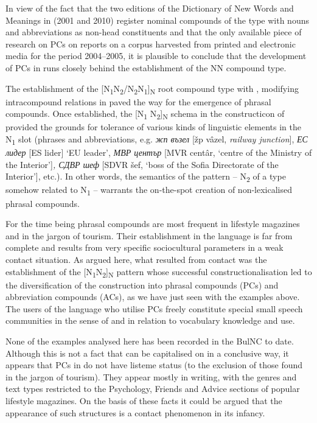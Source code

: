 \documentclass[output=paper]{LSP/langsci}
\begin{document}
In view of the fact that the two editions of the Dictionary of New Words and Meanings in  (2001 and 2010) register nominal compounds of the  type with nouns and abbreviations as non-head constituents and that the only available piece of research on PCs on  reports on a corpus harvested from printed and electronic media for the period 2004–2005, it is plausible to conclude that the development of PCs in  runs closely behind the establishment of the NN  compound type.



The establishment of the [N\textsubscript{1}N\textsubscript{2}/N\textsubscript{2}N\textsubscript{1}]\textsubscript{N} root compound type with , modifying intracompound relations in  paved the way for the emergence of phrasal compounds. Once established, the [N\textsubscript{1} N\textsubscript{2}]\textsubscript{N} schema in the constructicon of  provided the grounds for tolerance of various kinds of  linguistic elements in the N\textsubscript{1} slot (phrases and abbreviations, e.g. \textit{{жп възел} }[žp vâzel, \textit{railway junction}], \textit{{ЕС лидер} }[ES lider] ‘EU leader’, \textit{{МВР център} }[MVR centâr, ‘centre of the Ministry of the Interior’]\textit{, {СДВР шеф} }[SDVR šef, ‘boss of the Sofia Directorate of the Interior’], etc.). In other words, the semantics of the pattern – N\textsubscript{2} of a type somehow related to N\textsubscript{1} – warrants the on-the-spot creation of non-lexicalised phrasal compounds. 

For the time being phrasal compounds are most frequent in lifestyle magazines and in the jargon of tourism. Their establishment in the language is far from complete and results from very specific sociocultural parameters in a weak contact situation. As argued here, what resulted from contact was the establishment of the [N\textsubscript{1}N\textsubscript{2}]\textsubscript{N} pattern whose successful constructionalisation led to the diversification of the construction into phrasal compounds (PCs) and abbreviation compounds (ACs), as we have just seen with the examples above. The users of the language who utilise PCs freely constitute special small speech communities in the sense of \citet{Lipka2002} and \citet{Hohenhaus2005} in relation to vocabulary knowledge and use.

None of the examples analysed here has been recorded in the BulNC to date. Although this is not a fact that can be capitalised on in a conclusive way, it appears that PCs in  do not have listeme status (to the exclusion of those found in the jargon of tourism). They appear mostly in writing, with the genres and text types restricted to the Psychology, Friends and Advice sections of popular lifestyle magazines. On the basis of these facts it could be argued that the appearance of such structures is a contact phenomenon in its infancy. 
\end{document}
